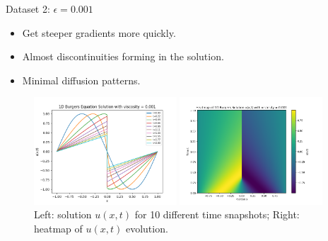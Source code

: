 \begin{secframe}
\begin{block}{Dataset 2: $\epsilon = 0.001$}
\begin{itemize}
  \item \small Get steeper gradients more quickly.
  \item \small Almost discontinuities forming in the solution.
  \item \small Minimal diffusion patterns.
\end{itemize}
\end{block}

\begin{figure}[h!]
    \centering
    \begin{minipage}[t]{0.48\linewidth}
        \centering
        \includegraphics[height=4.0cm]{images/graphical_visualization_1DBurgers_visc_0001.png}
    \end{minipage}\hfill
    \begin{minipage}[t]{0.48\linewidth}
        \centering
        \includegraphics[height=4.0cm]{images/Heatmap_1DBurgers_visc_0001.png}
    \end{minipage}
    \caption{\scriptsize Left: solution $u(x,t)$ for 10 different time snapshots; Right: heatmap of $u(x,t)$ evolution.}
\end{figure}
\end{secframe}

